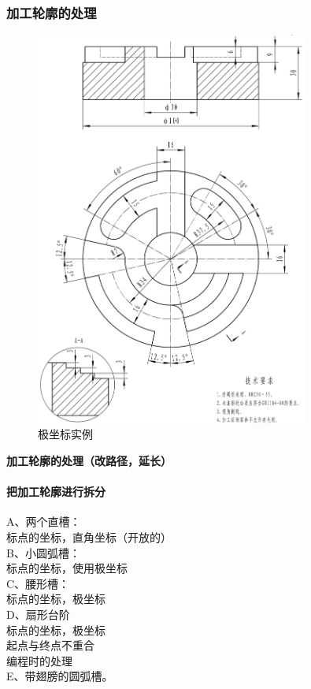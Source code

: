 \subsubsection{加工轮廓的处理}
\begin{figure}[!hbtp]
	\centering	\includegraphics[width=0.8\textwidth]{images/9-1}
	\caption{极坐标实例} \label{极坐标实例}
\end{figure}
\textbf{加工轮廓的处理（改路径，延长）}
\paragraph{把加工轮廓进行拆分}
\noindent A、两个直槽：\\
标点的坐标，直角坐标（开放的）\\
B、小圆弧槽：\\
标点的坐标，使用极坐标\\
C、腰形槽：\\
标点的坐标，极坐标\\
D、扇形台阶\\
标点的坐标，极坐标\\
起点与终点不重合\\
编程时的处理\\
E、带翅膀的圆弧槽。
